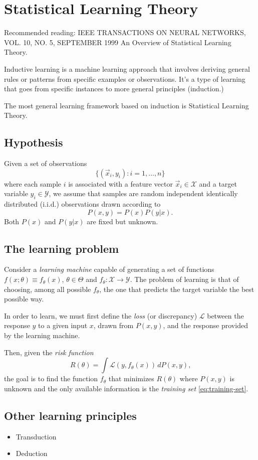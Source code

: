 \chapter{Statistical Learning Theory}

Recommended reading: IEEE TRANSACTIONS ON NEURAL NETWORKS, VOL. 10, NO. 5, SEPTEMBER 1999
An Overview of Statistical Learning Theory.

Inductive learning is a machine learning approach that involves deriving general rules or
patterns from specific examples or observations. It's a type of learning that goes from
specific instances to more general principles (induction.)

The most general learning framework based on induction is Statistical Learning Theory.

\section{Hypothesis}

Given a set of observations
\begin{equation}
  \label{eq:training-set}
  \big\{(\vec{x}_i, y_i) : i = 1, \dots, n \big\}
\end{equation}
where each sample $i$ is associated with a feature vector $\vec{x}_i \in \mathcal{X}$ and a target variable
$y_i \in \mathcal{Y}$, we assume that samples are random independent identically
distributed (i.i.d.) observations drawn according to $$P(x, y) = P(x) P(y | x)\text{.}$$
Both $P(x)$ and $P(y|x)$ are fixed but unknown.

\section{The learning problem}

Consider a \emph{learning machine} capable of generating a set of functions $f(x;
\theta) \equiv f_\theta(x)$, $\theta \in \Theta$ and $f_\theta : \mathcal{X} \rightarrow \mathcal{Y}$.
The problem of learning is that of choosing, among all possible $f_\theta$, the one that
predicts the target variable the best possible way.

In order to learn, we must first define the \emph{loss} (or discrepancy) $\mathcal{L}$
between the response $y$ to a given input $x$, drawn from $P(x, y)$, and the
response provided by the learning machine.

Then, given the \emph{risk function}
$$R(\theta) = \int \mathcal{L}(y, f_\theta(x))\, dP(x, y)\text{,}$$
the goal is to find the function $f_\theta$ that minimizes $R(\theta)$ where $P(x,y)$ is
unknown and the only available information is the \emph{training set}
\eqref{eq:training-set}.

\section{Other learning principles}

\begin{itemize}
  \item Transduction
  \item Deduction
\end{itemize}
